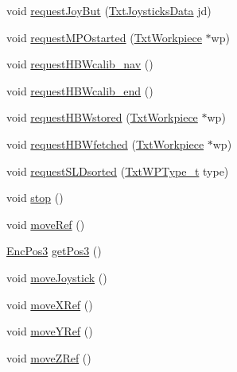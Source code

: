\begin{DoxyCompactItemize}
\item 
void \hyperlink{classft_1_1_txt_vacuum_gripper_robot_a9d9c74f1002ca322497746eac5bff815}{request\+Joy\+But} (\hyperlink{classft_1_1_txt_joysticks_data}{Txt\+Joysticks\+Data} jd)
\item 
void \hyperlink{classft_1_1_txt_vacuum_gripper_robot_aacae7f2a11ed3a4ef96f207cba15611d}{request\+M\+P\+Ostarted} (\hyperlink{classft_1_1_txt_workpiece}{Txt\+Workpiece} $\ast$wp)
\item 
void \hyperlink{classft_1_1_txt_vacuum_gripper_robot_a40b931eb82ba86eebc24895893ab830d}{request\+H\+B\+Wcalib\+\_\+nav} ()
\item 
void \hyperlink{classft_1_1_txt_vacuum_gripper_robot_af64652e126d1962840bf0e6b0fab0a1e}{request\+H\+B\+Wcalib\+\_\+end} ()
\item 
void \hyperlink{classft_1_1_txt_vacuum_gripper_robot_a70fa9e4c6503155756f59d376d923579}{request\+H\+B\+Wstored} (\hyperlink{classft_1_1_txt_workpiece}{Txt\+Workpiece} $\ast$wp)
\item 
void \hyperlink{classft_1_1_txt_vacuum_gripper_robot_ad0f221936fc34767074f64754d6275fa}{request\+H\+B\+Wfetched} (\hyperlink{classft_1_1_txt_workpiece}{Txt\+Workpiece} $\ast$wp)
\item 
void \hyperlink{classft_1_1_txt_vacuum_gripper_robot_accc6662e0903c6d9f91c47a9256719e2}{request\+S\+L\+Dsorted} (\hyperlink{namespaceft_a2d5bf01b2da29de3c061682f3195b5b2}{Txt\+W\+P\+Type\+\_\+t} type)
\item 
void \hyperlink{classft_1_1_txt_vacuum_gripper_robot_a465c53278509691530582333e61f10b6}{stop} ()
\item 
void \hyperlink{classft_1_1_txt_vacuum_gripper_robot_acd85e14b26413c3f83c8e8eba9e6a792}{move\+Ref} ()
\item 
\hyperlink{classft_1_1_enc_pos3}{Enc\+Pos3} \hyperlink{classft_1_1_txt_vacuum_gripper_robot_a506a7956f8d6ba21b0addfd7f86da0e3}{get\+Pos3} ()
\item 
void \hyperlink{classft_1_1_txt_vacuum_gripper_robot_adcea35ee8edfa1caa161f0daa09622ab}{move\+Joystick} ()
\item 
void \hyperlink{classft_1_1_txt_vacuum_gripper_robot_a7db008747bb8e51e287ebbd9bb115e5d}{move\+X\+Ref} ()
\item 
void \hyperlink{classft_1_1_txt_vacuum_gripper_robot_a5250c3ebeb2b627063cd1005fd81808b}{move\+Y\+Ref} ()
\item 
void \hyperlink{classft_1_1_txt_vacuum_gripper_robot_aa092966a5cb72f21682d1d8f0cd3343e}{move\+Z\+Ref} ()
\item 

\end{DoxyCompactItemize}
